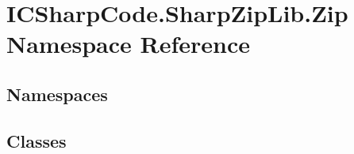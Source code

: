 \hypertarget{namespace_i_c_sharp_code_1_1_sharp_zip_lib_1_1_zip}{}\section{I\+C\+Sharp\+Code.\+Sharp\+Zip\+Lib.\+Zip Namespace Reference}
\label{namespace_i_c_sharp_code_1_1_sharp_zip_lib_1_1_zip}
\subsection*{Namespaces}
\begin{DoxyCompactItemize}
\end{DoxyCompactItemize}
\subsection*{Classes}
